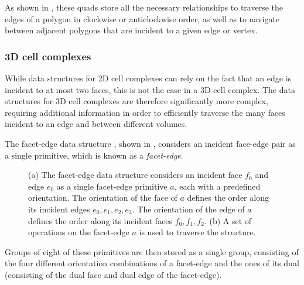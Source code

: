 As shown in , these quads store all the necessary relationships to traverse the edges of a polygon in clockwise or anticlockwise order, as well as to navigate between adjacent polygons that are incident to a given edge or vertex.

\subsubsection{3D cell complexes}

While data structures for 2D cell complexes can rely on the fact that an edge is incident to at most two faces, this is not the case in a 3D cell complex.
The data structures for 3D cell complexes are therefore significantly more complex, requiring additional information in order to efficiently traverse the many faces incident to an edge and between different volumes.

The facet-edge data structure \citep{Dobkin87}, shown in , considers an incident face-edge pair as a single primitive, which is known as a \emph{facet-edge}.
\begin{figure}[tbp]
\centering
{}
\quad
{}
\caption[The facet-edge data structure]{(a) The facet-edge data structure considers an incident face $f_0$ and edge $e_0$ as a single facet-edge primitive $a$, each with a predefined orientation. The orientation of the face of $a$ defines the order along its incident edges $e_0,e_1,e_2,e_3$. The orientation of the edge of $a$ defines the order along its incident faces $f_0,f_1,f_2$. (b) A set of operations on the facet-edge $a$ is used to traverse the structure.}
\label{fig:facet-edge}
\end{figure}
Groups of eight of these primitives are then stored as a single group, consisting of the four different orientation combinations of a facet-edge and the ones of its dual (consisting of the dual face and dual edge of the facet-edge).

